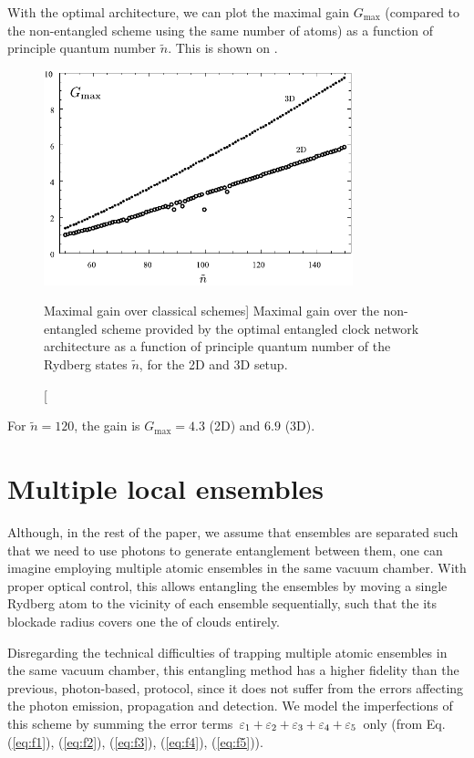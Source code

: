 With the optimal architecture, we can plot the maximal gain $G_\mathrm{max}$
(compared to the non-entangled scheme using the same number of atoms) as a
function of principle quantum number $\tilde n$.
This is shown on .
\begin{figure}[h]
\centering
\includegraphics[width=0.8\textwidth]{./figs_Komar2015/gain_2d3d.pdf}
\caption
[Maximal gain over classical schemes]
{
\label{fig:gain}
Maximal gain over the non-entangled scheme provided by the optimal entangled
clock network architecture as a function of principle quantum number of the
Rydberg states $\tilde n$, for the 2D and 3D setup.}
\end{figure}
For $\tilde n = 120$, the gain is $G_\mathrm{max} = 4.3$ (2D) and $6.9$ (3D).


\section{Multiple local ensembles}
\label{app:Multiple_local_ensembles}
Although, in the rest of the paper, we assume that ensembles are separated such
that we need to use photons to generate entanglement between them, one can
imagine employing multiple atomic ensembles in the same vacuum chamber. With
proper optical control, this allows entangling the ensembles by moving a single
Rydberg atom to the vicinity of each ensemble sequentially, such that the its
blockade radius covers one the of clouds entirely.

Disregarding the technical difficulties of trapping multiple atomic ensembles in
the same vacuum chamber, this entangling method has a higher fidelity than the
previous, photon-based, protocol, since it does not suffer from the errors
affecting the photon emission, propagation and detection. We model the
imperfections of this scheme by summing the error terms $\varepsilon_1 + \varepsilon_2 +
\varepsilon_3 + \varepsilon_4 + \varepsilon_5$ only (from Eq.
(\ref{eq:f1}), (\ref{eq:f2}), (\ref{eq:f3}), (\ref{eq:f4}), (\ref{eq:f5})).

